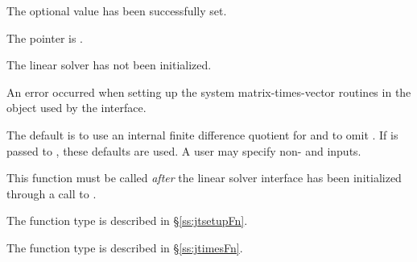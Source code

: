 {{\begin{args}
    The optional value has been successfully set.
  \item[\Id{IDALS\_MEM\_NULL}]
    The  pointer is .
  \item[\Id{IDALS\_LMEM\_NULL}]
    The {\idals} linear solver has not been initialized.
  \item[\Id{IDALS\_SUNLS\_FAIL}]
    An error occurred when setting up the system matrix-times-vector
    routines in the {\sunlinsol} object used by the {\idals}
    interface.
  \end{args}
}
{
  The default is to use an internal finite difference quotient for
   and to omit .  If  is passed to
  , these defaults are used.  A user may specify
  non-  and   inputs.

  This function must be called \emph{after} the {\idals} linear solver
  interface has been initialized through a call to
  .

  The function type  is described in \S\ref{ss:jtsetupFn}.

  The function type  is described in \S\ref{ss:jtimesFn}.

}}
